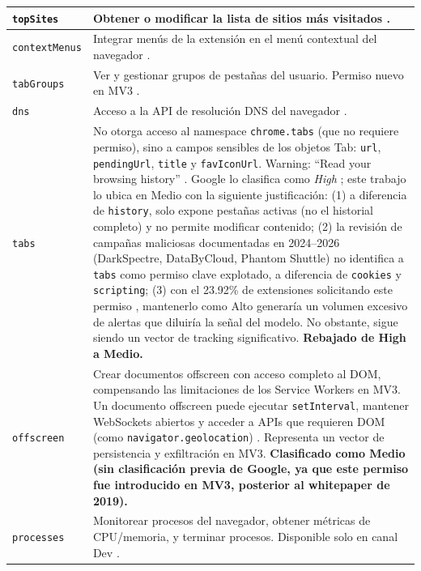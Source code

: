 \documentclass[12pt,oneside]{report}
\begin{document}
{\begin{longtable}{|p{3.5cm}|p{11cm}|}
\texttt{topSites} & Obtener o modificar la lista de sitios más visitados \cite{google_permission_risk}. \\
\hline
\texttt{contextMenus} & Integrar menús de la extensión en el menú contextual del navegador \cite{google_permission_risk}. \\
\hline
\texttt{tabGroups} & Ver y gestionar grupos de pestañas del usuario. Permiso nuevo en MV3 \cite{chrome_permissions_list}. \\
\hline
\texttt{dns} & Acceso a la API de resolución DNS del navegador \cite{chrome_permissions_list}. \\
\hline
\texttt{tabs} & No otorga acceso al namespace \texttt{chrome.tabs} (que no requiere permiso), sino a campos sensibles de los objetos Tab: \texttt{url}, \texttt{pendingUrl}, \texttt{title} y \texttt{favIconUrl}. Warning: ``Read your browsing history'' \cite{chrome_permissions_list}. Google lo clasifica como \textit{High} \cite{google_permission_risk}; este trabajo lo ubica en Medio con la siguiente justificación: (1) a diferencia de \texttt{history}, solo expone pestañas activas (no el historial completo) y no permite modificar contenido; (2) la revisión de campañas maliciosas documentadas en 2024--2026 (DarkSpectre, DataByCloud, Phantom Shuttle) no identifica a \texttt{tabs} como permiso clave explotado, a diferencia de \texttt{cookies} y \texttt{scripting}; (3) con el 23.92\% de extensiones solicitando este permiso \cite{layerx2025report}, mantenerlo como Alto generaría un volumen excesivo de alertas que diluiría la señal del modelo. No obstante, sigue siendo un vector de tracking significativo. \textbf{Rebajado de High a Medio.} \\
\hline
\texttt{offscreen} & Crear documentos offscreen con acceso completo al DOM, compensando las limitaciones de los Service Workers en MV3. Un documento offscreen puede ejecutar \texttt{setInterval}, mantener WebSockets abiertos y acceder a APIs que requieren DOM (como \texttt{navigator.geolocation}) \cite{chrome_permissions_list}. Representa un vector de persistencia y exfiltración en MV3. \textbf{Clasificado como Medio (sin clasificación previa de Google, ya que este permiso fue introducido en MV3, posterior al whitepaper de 2019).} \\
\hline
\texttt{processes} & Monitorear procesos del navegador, obtener métricas de CPU/memoria, y terminar procesos. Disponible solo en canal Dev \cite{chrome_permissions_list}. \\
\hline
\end{longtable}
}
\end{document}
